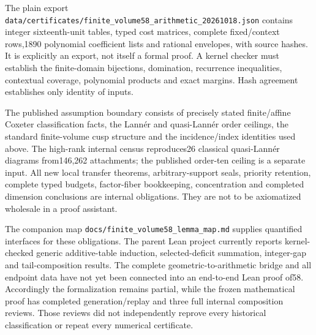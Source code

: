 \documentclass[11pt]{article}
\theoremstyle{remark}\newtheorem{remark}[theorem]{Remark}
\newcommand{\cert}[1]{\nolinkurl{#1}}
\begin{document}
The plain export
\cert{data/certificates/finite_volume58_arithmetic_20261018.json}
contains integer sixteenth-unit tables, typed cost matrices, complete
fixed/context rows,1890 polynomial coefficient lists and rational
envelopes, with source hashes. It is explicitly an export, not itself
a formal proof. A kernel checker must establish the finite-domain
bijections, domination, recurrence inequalities, contextual coverage,
polynomial products and exact margins. Hash agreement establishes only
identity of inputs.

The published assumption boundary consists of precisely stated
finite/affine Coxeter classification facts, the Lann\'er and quasi-Lann\'er
order ceilings, the standard finite-volume cusp structure and the
incidence/index identities used above. The high-rank internal census
reproduces26 classical quasi-Lann\'er diagrams from146,262 attachments;
the published order-ten ceiling is a separate input. All new local
transfer theorems, arbitrary-support seals, priority retention, complete
typed budgets, factor-fiber bookkeeping, concentration and completed
dimension conclusions are internal obligations. They are not to be
axiomatized wholesale in a proof assistant.

The companion map \cert{docs/finite_volume58_lemma_map.md} supplies
quantified interfaces for these obligations. The parent Lean project
currently reports kernel-checked generic additive-table induction,
selected-deficit summation, integer-gap and tail-composition results.
The complete geometric-to-arithmetic bridge and all endpoint data have
not yet been connected into an end-to-end Lean proof of58. Accordingly
the formalization remains partial, while the frozen mathematical proof
has completed generation/replay and three full internal composition
reviews. Those reviews did not independently reprove every historical
classification or repeat every numerical certificate.

\appendix
\end{document}
